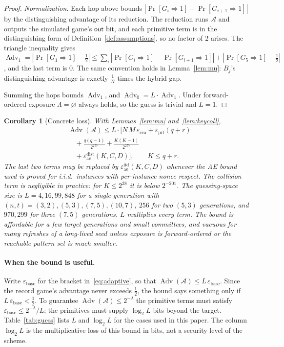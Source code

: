 \documentclass[pdflatex,sn-mathphys-num,twocolumn]{sn-jnl}
\theoremstyle{plain}
\newtheorem{corollary}[theorem]{Corollary}
\theoremstyle{definition}
\newcommand{\Adv}{\operatorname{Adv}}
\begin{document}
\begin{proof}
\emph{Normalization.} Each hop above bounds $|\Pr[G_i\Rightarrow1]-\Pr[G_{i+1}\Rightarrow1]|$ by the distinguishing advantage of its reduction. The reduction runs $\mathcal A$ and outputs the simulated game's $\mathsf{out}$ bit, and each primitive term is in the distinguishing form of Definition~\ref{def:assumptions}, so no factor of $2$ arises. The triangle inequality gives $\Adv_1=|\Pr[G_1\Rightarrow1]-\tfrac12|\le\sum_i|\Pr[G_i\Rightarrow1]-\Pr[G_{i+1}\Rightarrow1]|+|\Pr[G_5\Rightarrow1]-\tfrac12|$, and the last term is $0$. The same convention holds in Lemma~\ref{lem:mu}: $B_j$'s distinguishing advantage is exactly $\tfrac1N$ times the hybrid gap.

Summing the hops bounds $\Adv_1$, and $\Adv_0=L\cdot\Adv_1$. Under forward-ordered exposure $\Lambda=\varnothing$ always holds, so the guess is trivial and $L=1$.
\end{proof}

\begin{corollary}[Concrete loss]\label{cor:loss}
With Lemmas~\ref{lem:mu} and~\ref{lem:keycoll},
\begin{align*}
 &\Adv(\mathcal A)\le L\cdot\Big[N\,M\,\varepsilon_{\mathrm{cca}}+\varepsilon_{\mathrm{prf}}(q+r)\\
 &\quad+\frac{q(q-1)}{2^{257}}+\frac{K(K-1)}{2^{257}}\\
 &\quad+\varepsilon^{\mathrm{dist}}_{\mathrm{ae}}(K,C,D)\Big],\qquad K\le q+r.
\end{align*}
The last two terms may be replaced by $\varepsilon^{\mathrm{iid}}_{\mathrm{ae}}(K,C,D)$ whenever the AE bound used is proved for i.i.d.\ instances with per-instance nonce respect. The collision term is negligible in practice: for $K\le2^{28}$ it is below $2^{-201}$.
The guessing-space size is $L=4,16,99,848$ for a single generation with $(n,t)=(3,2),(5,3),(7,5),(10,7)$, $256$ for two $(5,3)$ generations, and $970{,}299$ for three $(7,5)$ generations. $L$ multiplies every term. The bound is affordable for a few target generations and small committees, and vacuous for many refreshes of a long-lived seed unless exposure is forward-ordered or the reachable pattern set is much smaller.
\end{corollary}

\paragraph{When the bound is useful.}
Write $\varepsilon_{\mathrm{base}}$ for the bracket in~\eqref{eq:adaptive}, so that $\Adv(\mathcal A)\le L\,\varepsilon_{\mathrm{base}}$. Since the record game's advantage never exceeds $\tfrac12$, the bound says something only if $L\,\varepsilon_{\mathrm{base}}<\tfrac12$. To guarantee $\Adv(\mathcal A)\le2^{-\lambda}$ the primitive terms must satisfy $\varepsilon_{\mathrm{base}}\le2^{-\lambda}/L$; the primitives must supply $\log_2L$ bits beyond the target. Table~\ref{tab:guess} lists $L$ and $\log_2L$ for the cases used in this paper. The column $\log_2L$ is the multiplicative loss of this bound in bits, not a security level of the scheme.
\end{document}
